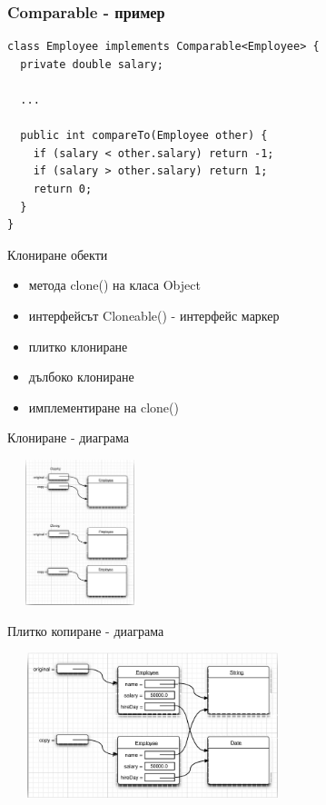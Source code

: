 \documentclass{beamer}
\begin{document}
\begin{frame}[fragile]
  \frametitle{Comparable - пример}
  
\begin{lstlisting}
class Employee implements Comparable<Employee> {
  private double salary;

  ...  

  public int compareTo(Employee other) {
    if (salary < other.salary) return -1;
    if (salary > other.salary) return 1;
    return 0;
  }
}  
\end{lstlisting}
\end{frame}

\begin{frame}{Клониране обекти}
  
  \begin{itemize}
  \item метода clone() на класа Object 
  \item интерфейсът Cloneable() - интерфейс маркер 
  \item плитко клониране 
  \item дълбоко клониране 
  \item имплементиране на clone()
  \end{itemize}
\end{frame}

\begin{frame}{Клониране - диаграма}
  
  \includegraphics[width=160px,height=160px]{images/cloning.png}
\end{frame}

\begin{frame}{Плитко копиране - диаграма}
  
  \includegraphics[width=320px,height=160px]{images/shallow-copy.png}
\end{frame}
\end{document}

